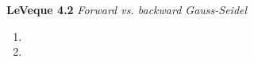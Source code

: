 \textbf{LeVeque 4.2} \textit{Forward vs. backward Gauss-Seidel}

\begin{enumerate}
  \item 
  \pagebreak
  \item 
\end{enumerate} 